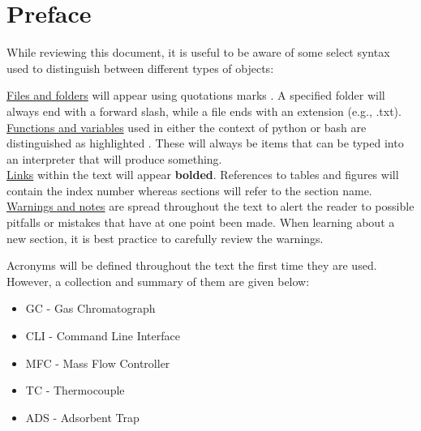 \section{Preface}
While reviewing this document, it is useful to be aware of some select syntax used to distinguish between different types of objects:

\underline{Files and folders} will appear using quotations marks . A specified folder will always end with a forward slash, while a file ends with an extension (e.g., .txt).\\[\baselineskip]
\underline{Functions and variables} used in either the context of python or bash are distinguished as highlighted . These will always be items that can be typed into an interpreter that will produce something.\\[\baselineskip]
\underline{Links} within the text will appear \textbf{bolded}. References to tables and figures will contain the index number whereas sections will refer to the section name.\\[\baselineskip]
\underline{Warnings and notes} are spread throughout the text to alert the reader to possible pitfalls or mistakes that have at one point been made. When learning about a new section, it is best practice to carefully review the warnings.


Acronyms will be defined throughout the text the first time they are used. However, a collection and summary of them are given below:
\begin{itemize}
    \item GC - Gas Chromatograph
    \item CLI - Command Line Interface
    \item MFC - Mass Flow Controller
    \item TC - Thermocouple
    \item ADS - Adsorbent Trap
\end{itemize}

\pagebreak